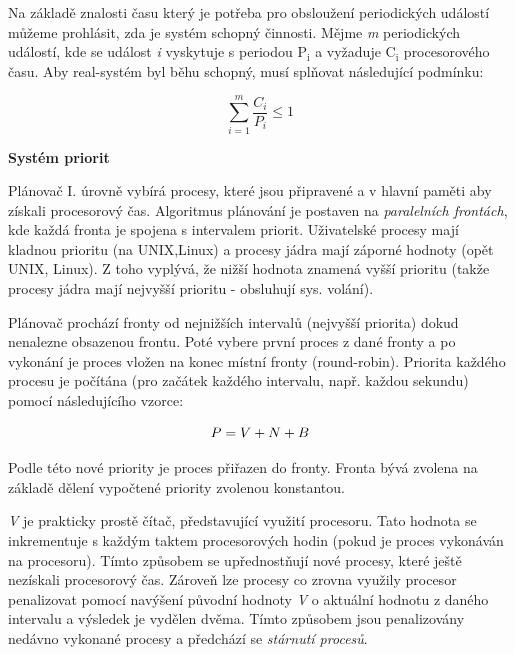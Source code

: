 \vspace{0,5cm}

Na základě znalosti času který je potřeba pro obsloužení periodických událostí můžeme prohlásit, zda je systém schopný činnosti. Mějme \textit{m} periodických událostí, kde se událost \textit{i} vyskytuje s periodou $\mathrm{P_i}$ a vyžaduje $\mathrm{C_i}$ procesorového času. Aby real-systém byl běhu schopný, musí splňovat následující podmínku:

\begin{equation}
    \sum\limits_{i=1}^m \frac{C_i}{P_i} \leq 1 \nonumber \nonumber 
\end{equation}

\newpage

\begin{Large}
    \vspace{0,5cm}
    \textbf{Systém priorit}
\end{Large}

Plánovač I. úrovně vybírá procesy, které jsou připravené a v hlavní paměti aby získali procesorový čas. Algoritmus plánování je postaven na \textit{paralelních frontách}, kde každá fronta je spojena s intervalem priorit. Uživatelské procesy mají kladnou prioritu (na UNIX,Linux) a procesy jádra mají záporné hodnoty (opět UNIX, Linux). Z toho vyplývá, že nižší hodnota znamená vyšší prioritu (takže procesy jádra mají nejvyšší prioritu - obsluhují sys. volání).  

\vspace{0,5cm}

Plánovač prochází fronty od nejnižších intervalů (nejvyšší priorita) dokud nenalezne obsazenou frontu. Poté vybere první proces z dané fronty a po vykonání je proces vložen na konec místní fronty (round-robin). Priorita každého procesu je počítána (pro začátek každého intervalu, např. každou sekundu) pomocí následujícího vzorce:

\begin{equation}
    P = V + N + B \nonumber \notag
\end{equation}

Podle této nové priority je proces přiřazen do fronty. Fronta bývá zvolena na základě dělení vypočtené priority zvolenou konstantou. 

\vspace{0,5cm}

\textit{V} je prakticky prostě čítač, představující využití procesoru. Tato hodnota se inkrementuje s každým taktem procesorových hodin (pokud je proces vykonáván na procesoru). Tímto způsobem se upřednostňují nové procesy, které ještě nezískali procesorový čas. Zároveň lze procesy co zrovna využily procesor penalizovat pomocí navýšení původní hodnoty \textit{V} o aktuální hodnotu z daného intervalu a výsledek je vydělen dvěma. Tímto způsobem jsou penalizovány nedávno vykonané procesy a předchází se \textit{stárnutí procesů}.

